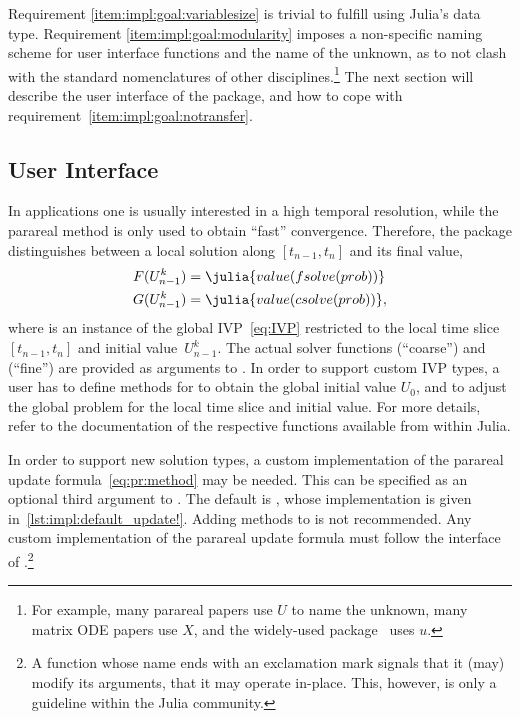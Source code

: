 Requirement \ref{item:impl:goal:variablesize} is trivial to fulfill using Julia's  data type.
Requirement \ref{item:impl:goal:modularity} imposes a non-specific naming scheme for
user interface functions and the name of the unknown,
as to not clash with the standard nomenclatures of other disciplines.\footnote{%
  For example,
  many parareal papers use $U$ to name the unknown,
  many matrix \ac{ODE} papers use $X$,
  and the widely-used  package~\cite{DifferentialEquations} uses $u$.
}
The next section will describe the user interface of the  package,
and how to cope with requirement~\ref{item:impl:goal:notransfer}.

\subsection{User Interface}

In applications one is usually interested in a high temporal resolution,
while the parareal method is only used to obtain \enquote{fast} convergence.
Therefore, the  package distinguishes between a local solution along $[t_{n-1}, t_n]$ and its final value,
\begin{align*}
  F(U_{n-1}^k) &= \julia{value(fsolve(prob))} \\
  G(U_{n-1}^k) &= \julia{value(csolve(prob))}
  ,
\end{align*}
where  is an instance of the global \ac{IVP}~\eqref{eq:IVP}
restricted to the local time slice~$[t_{n-1}, t_n]$ and initial value~$U_{n-1}^k$.
The actual solver functions  (\enquote{coarse}) and  (\enquote{fine})
are provided as arguments to .
In order to support custom \ac{IVP} types,
a user has to define methods for  to obtain the global initial value $U_0$,
and  to adjust the global problem for the local time slice and initial value.
For more details, refer to the documentation of the respective functions available from within Julia.

In order to support new solution types,
a custom implementation of the parareal update formula~\eqref{eq:pr:method} may be needed.
This can be specified as an optional third argument to .
The default is ,
whose implementation is given in~\autoref{lst:impl:default_update!}.
Adding methods to  is not recommended.
Any custom implementation of the parareal update formula must follow the interface of .\footnote{%
  A function whose name ends with an exclamation mark signals that it (may) modify its arguments,
  \ie that it may operate in-place.
  This, however, is only a guideline within the Julia community.
}


